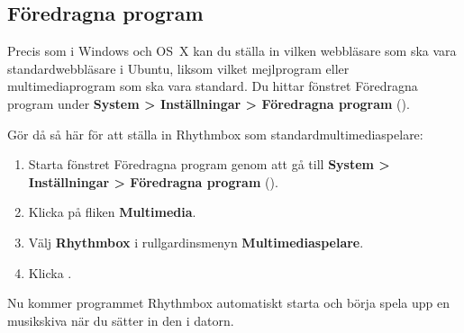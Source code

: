 \documentclass[a4paper,final]{memoir} %
\begin{document}


\subsection{Föredragna program}


Precis som i Windows och OS~X kan du ställa in vilken webbläsare som ska vara standardwebbläsare i Ubuntu, liksom vilket mejlprogram eller multimediaprogram som ska vara standard. Du hittar fönstret Föredragna program under \textbf{System \textgreater{} Inställningar \textgreater{} Föredragna program} ().


Gör då så här för att ställa in Rhythmbox som standardmultimediaspelare:

\begin{enumerate}

\item Starta fönstret Föredragna program genom att gå till \textbf{System \textgreater{} Inställningar \textgreater{} Föredragna program} ().

\item Klicka på fliken \textbf{Multimedia}.

\item Välj \textbf{Rhythmbox} i rullgardinsmenyn \textbf{Multimediaspelare}.


\item Klicka \xstang{}.

\end{enumerate}

Nu kommer programmet Rhythmbox automatiskt starta och börja spela upp en musikskiva när du sätter in den i datorn. 

\end{document}
